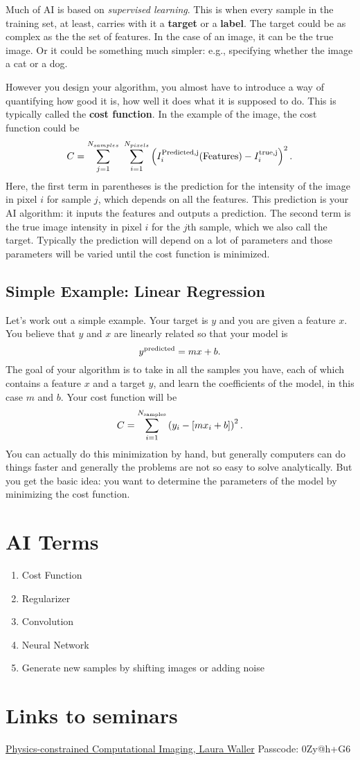 \documentclass[prd,amsmath,aps,floats,amssymb, floatfix,
  superscriptaddress,nofootinbib]{revtex4-1}
\numberwithin{equation}{section}
\newcommand\be{\begin{equation}}
\newcommand\ee{\end{equation}}
\newcommand\bee{\begin{enumerate}}
\newcommand\eee{\end{enumerate}}
\begin{document}
Much of AI is based on {\it supervised learning}. This is when every sample in the training set, at least, carries with it a {\bf target} or a {\bf label}. The target could be as complex as the the set of features. In the case of an image, it can be the true image. Or it could be something much simpler: e.g., specifying whether the image a cat or a dog.  

However you design your algorithm, you almost have to introduce a way of quantifying how good it is, how well it does what it is supposed to do. This is typically called the {\bf cost function}. In the example of the image, the cost function could be
\be
C = \sum_{j=1}^{N_{samples}}\ \sum_{i=1}^{N_{pixels}} \left( I^{\rm Predicted,j }_i({\rm Features}) - I^{\rm true, j}_i\right)^2.\ee
Here, the first term in parentheses is the prediction for the intensity of the image in pixel $i$ for sample $j$, which depends on all the features. This prediction is your AI algorithm: it inputs the features and outputs a prediction. The second term is the true image intensity in pixel $i$ for the $j$th sample, which we also call the target. Typically the prediction will depend on a lot of parameters and those parameters will be varied until the cost function is minimized.  

\subsection{Simple Example: Linear Regression}

Let's work out a simple example. Your target is $y$ and you are given a feature $x$. You believe that $y$ and $x$ are linearly related so that your model is
\be
y^{\rm predicted} = mx+b
.\ee
The goal of your algorithm is to take in all the samples you have, each of which contains a feature $x$ and a target $y$, and learn the coefficients of the model, in this case $m$ and $b$. Your cost function will be
\be
C = \sum_{i=1}^{N_{\rm samples}} \left( y_i - [mx_i+b]\right)^2.\ee
You can actually do this minimization by hand, but generally computers can do things faster and generally the problems are not so easy to solve analytically. But you get the basic idea: you want to determine the parameters of the model by minimizing the cost function.


 
 \appendix
 
  
 \section{AI Terms}\label{sec:unblind}
 \bee
 \item Cost Function
 \item Regularizer
 \item Convolution
 \item Neural Network
 \item Generate new samples by shifting images or adding noise
 \eee
 
 \section{Links to seminars}
 
 \href{https://cmu.zoom.us/rec/share/2m9MSmtj6mbf7A_ueusvKnZIFItFV3HPI7QVJ7zlfSCCZGRzBt3iTHKs_fcKLJKx.3rNWZExDpw63YeTg}{Physics-constrained Computational Imaging, Laura Waller} Passcode: 0Zy@h+G6
\end{document}
